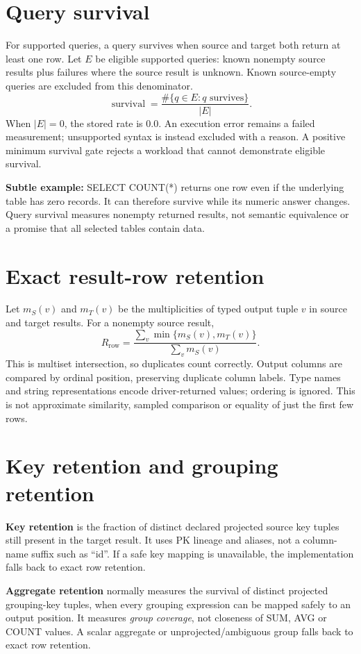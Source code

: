 \documentclass[11pt,a4paper,oneside]{report}
\begin{document}
\section{Query survival}
For supported queries, a query survives when source and target both return at least one row. Let $E$ be eligible supported queries: known nonempty source results plus failures where the source result is unknown. Known source-empty queries are excluded from this denominator.
\[
\operatorname{survival}=\frac{\#\{q\in E: q\text{ survives}\}}{|E|}.
\]
When $|E|=0$, the stored rate is 0.0. An execution error remains a failed measurement; unsupported syntax is instead excluded with a reason. A positive minimum survival gate rejects a workload that cannot demonstrate eligible survival.

\textbf{Subtle example:} SELECT COUNT(*) returns one row even if the underlying table has zero records. It can therefore survive while its numeric answer changes. Query survival measures nonempty returned results, not semantic equivalence or a promise that all selected tables contain data.

\section{Exact result-row retention}
Let $m_S(v)$ and $m_T(v)$ be the multiplicities of typed output tuple $v$ in source and target results. For a nonempty source result,
\[
R_{\mathrm{row}}=\frac{\sum_v\min\{m_S(v),m_T(v)\}}{\sum_v m_S(v)}.
\]
This is multiset intersection, so duplicates count correctly. Output columns are compared by ordinal position, preserving duplicate column labels. Type names and string representations encode driver-returned values; ordering is ignored. This is not approximate similarity, sampled comparison or equality of just the first few rows.

\section{Key retention and grouping retention}
\textbf{Key retention} is the fraction of distinct declared projected source key tuples still present in the target result. It uses PK lineage and aliases, not a column-name suffix such as ``id''. If a safe key mapping is unavailable, the implementation falls back to exact row retention.

\textbf{Aggregate retention} normally measures the survival of distinct projected grouping-key tuples, when every grouping expression can be mapped safely to an output position. It measures \emph{group coverage}, not closeness of SUM, AVG or COUNT values. A scalar aggregate or unprojected/ambiguous group falls back to exact row retention.
\end{document}
